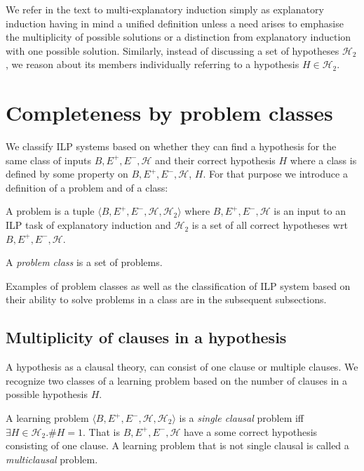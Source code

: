 We refer in the text to multi-explanatory induction simply as explanatory induction having in mind a unified definition unless a need arises to emphasise the multiplicity of possible solutions or a distinction from explanatory induction with one possible solution. Similarly, instead of discussing a set of hypotheses $\mathcal{H}_2$, we reason about its members individually referring to a hypothesis $H \in \mathcal{H}_2$.
\section{Completeness by problem classes}
We classify ILP systems based on whether they can find a hypothesis for the same class of inputs $B, E^+, E^-, \mathcal{H}$ and their correct hypothesis $H$ where a class is defined by some property on $B, E^+, E^-, \mathcal{H}$, $H$. For that purpose we introduce a definition of a problem and of a class:

\begin{defn}
A problem is a tuple $\langle B, E^+, E^-, \mathcal{H}, \mathcal{H}_2 \rangle$ where
$B, E^+, E^-, \mathcal{H}$ is an input to an ILP task of explanatory induction and $\mathcal{H}_2$ is a set of all correct hypotheses wrt $B, E^+, E^-, \mathcal{H}$.
\end{defn}

\begin{defn}
A \emph{problem class} is a set of problems.
\end{defn}

Examples of problem classes as well as the classification of ILP system based on their ability to solve problems in a class are in the subsequent subsections.

\subsection{Multiplicity of clauses in a hypothesis}
A hypothesis as a clausal theory, can consist of one clause or multiple clauses. 
We recognize two classes of a learning problem based on the number of clauses in a possible hypothesis $H$.

\begin{defn}
A learning problem $\langle B, E^+, E^-, \mathcal{H}, \mathcal{H}_2 \rangle$ is a 
\emph{single clausal} problem iff $\exists H \in \mathcal{H}_2. \#H = 1$. That is $B, E^+, E^-, \mathcal{H}$ have a some correct hypothesis consisting of one clause.
A learning problem that is not single clausal is called a \emph{multiclausal} problem.
\end{defn}

